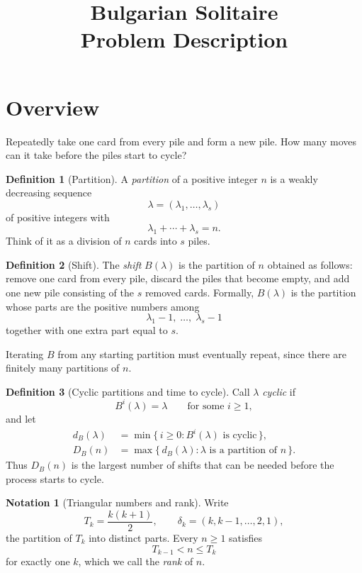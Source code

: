 \documentclass[11pt]{article}
\title{Bulgarian Solitaire\\[0.4em]\large Problem Description}
\author{}
\date{}
\theoremstyle{definition}
\newtheorem*{definition}{Definition}
\newtheorem*{notation}{Notation}
\newcommand{\DB}{D_B}
\newcommand{\dB}{d_B}
\begin{document}
\maketitle

\section*{Overview}

Repeatedly take one card from every pile and form a new pile.
How many moves can it take before the piles start to cycle?

\begin{definition}[Partition]
A \emph{partition} of a positive integer $n$ is a weakly decreasing
sequence
\[
  \lambda = (\lambda_1, \ldots, \lambda_s)
\]
of positive integers with
\[
  \lambda_1 + \cdots + \lambda_s = n.
\]
Think of it as a division of $n$ cards into $s$ piles.
\end{definition}

\begin{definition}[Shift]
The \emph{shift} $B(\lambda)$ is the partition of $n$ obtained as
follows: remove one card from every pile, discard the piles that
become empty, and add one new pile consisting of the $s$ removed
cards. Formally, $B(\lambda)$ is the partition whose parts are the
positive numbers among
\[
  \lambda_1 - 1, \; \ldots, \; \lambda_s - 1
\]
together with one extra part equal to $s$.
\end{definition}

Iterating $B$ from any starting partition must eventually repeat,
since there are finitely many partitions of $n$.

\begin{definition}[Cyclic partitions and time to cycle]
Call $\lambda$ \emph{cyclic} if
\[
  B^i(\lambda) = \lambda \qquad \text{for some } i \geq 1,
\]
and let
\begin{align*}
  \dB(\lambda) &= \min\bigl\{\, i \geq 0 : B^i(\lambda) \text{ is cyclic} \,\bigr\}, \\
  \DB(n)       &= \max\bigl\{\, \dB(\lambda) : \lambda \text{ is a partition of } n \,\bigr\}.
\end{align*}
Thus $\DB(n)$ is the largest number of shifts that can be needed
before the process starts to cycle.
\end{definition}

\begin{notation}[Triangular numbers and rank]
Write
\[
  T_k = \frac{k(k+1)}{2},
  \qquad
  \delta_k = (k, k-1, \ldots, 2, 1),
\]
the partition of $T_k$ into distinct parts. Every $n \geq 1$
satisfies
\[
  T_{k-1} < n \leq T_k
\]
for exactly one $k$, which we call the \emph{rank} of $n$.
\end{notation}
\end{document}
